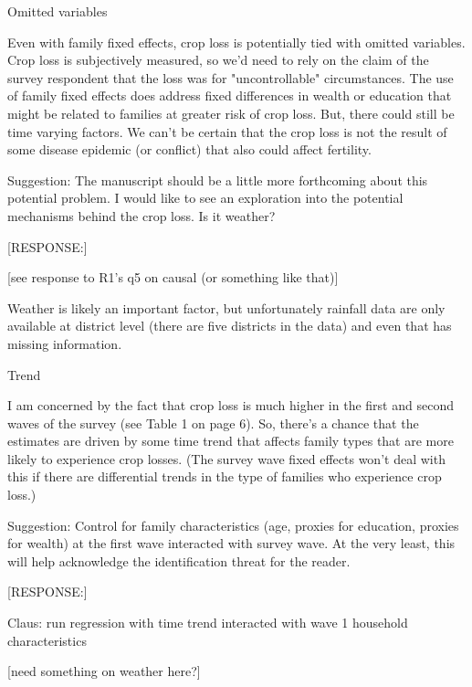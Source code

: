 \documentclass[letterpaper,12pt]{article}
\begin{document}
\begin{description}

\item Omitted variables

Even with family fixed effects, crop loss is potentially tied with
omitted variables. Crop loss is subjectively measured, so we'd need to
rely on the claim of the survey respondent that the loss was for
"uncontrollable" circumstances. The use of family fixed effects does
address fixed differences in wealth or education that might be related
to families at greater risk of crop loss. But, there could still be time
varying factors. We can't be certain that the crop loss is not the
result of some disease epidemic (or conflict) that also could affect
fertility.

Suggestion: The manuscript should be a little more forthcoming about
this potential problem. I would like to see an exploration into the
potential mechanisms behind the crop loss. Is it weather?

[RESPONSE:]

[see response to R1's q5 on causal (or something like that)]

Weather is likely an important factor, but unfortunately rainfall data
are only available at district level (there are five districts in the
data) and even that has missing information.

\item Trend

I am concerned by the fact that crop loss is much higher in the first
and second waves of the survey (see Table 1 on page 6). So, there's a
chance that the estimates are driven by some time trend that affects
family types that are more likely to experience crop losses. (The survey
wave fixed effects won't deal with this if there are differential trends
in the type of families who experience crop loss.)

Suggestion: Control for family characteristics (age, proxies for
education, proxies for wealth) at the first wave interacted with survey
wave. At the very least, this will help acknowledge the identification
threat for the reader.


[RESPONSE:] 

Claus: run regression with time trend interacted with wave 1 household characteristics

[need something on weather here?]


\end{description}
\end{document}
